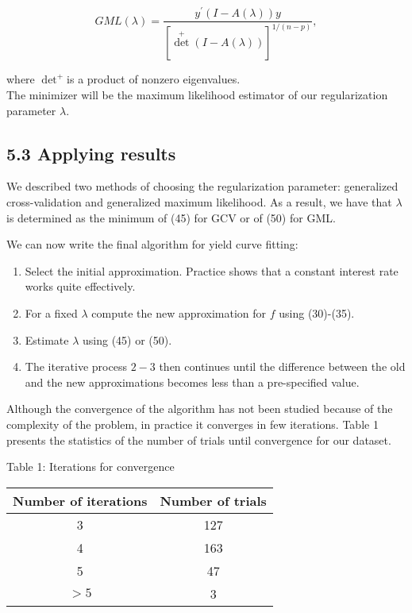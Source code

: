 \documentclass[10pt]{article}
\begin{document}
\begin{equation*}
G M L(\lambda)=\frac{y^{\prime}(I-A(\lambda)) y}{\left[\operatorname{det}^{+}(I-A(\lambda))\right]^{1 /(n-p)}}, \tag{50}
\end{equation*}


where $\operatorname{det}^{+}$is a product of nonzero eigenvalues.\\
The minimizer will be the maximum likelihood estimator of our regularization parameter $\lambda$.

\subsection*{5.3 Applying results}
We described two methods of choosing the regularization parameter: generalized cross-validation and generalized maximum likelihood. As a result, we have that $\lambda$ is determined as the minimum of (45) for GCV or of (50) for GML.

We can now write the final algorithm for yield curve fitting:

\begin{enumerate}
  \item Select the initial approximation. Practice shows that a constant interest rate works quite effectively.
  \item For a fixed $\lambda$ compute the new approximation for $f$ using (30)-(35).
  \item Estimate $\lambda$ using (45) or (50).
  \item The iterative process $2-3$ then continues until the difference between the old and the new approximations becomes less than a pre-specified value.
\end{enumerate}

Although the convergence of the algorithm has not been studied because of the complexity of the problem, in practice it converges in few iterations. Table 1 presents the statistics of the number of trials until convergence for our dataset.

Table 1: Iterations for convergence

\begin{center}
\begin{tabular}{|c|c|}
\hline
Number of iterations & Number of trials \\
\hline
3 & 127 \\
4 & 163 \\
5 & 47 \\
$>5$ & 3 \\
\hline
\end{tabular}
\end{center}
\end{document}
